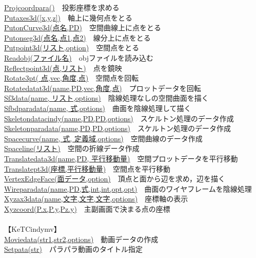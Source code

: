 \documentclass[papersize,a4paper,12pt,uplatex]{jsarticle}
\begin{document}
\begin{tabbing}
\hyperlink{projcoordpara}{Projcoordpara()}　\>投影座標を求める\\
\hyperlink{putaxes3d}{Putaxes3d([x,y,z])}　\>軸上に幾何点をとる\\
\hyperlink{putonCurve3d}{PutonCurve3d(点名,PD)}　\>空間曲線上に点をとる\\
\hyperlink{putonseg3d}{Putonseg3d(点名,点1,点2)}　\>線分上に点をとる\\
\hyperlink{putpoint3d}{Putpoint3d(リスト,option)}　\>空間点をとる\\
\hyperlink{readobj}{Readobj(ファイル名)}　\>objファイルを読み込む\\
\hyperlink{reflectpoint3d}{Reflectpoint3d(点,リスト)}　\>点を鏡映\\
\hyperlink{rotate3pt}{Rotate3pt( 点,vec,角度,点)}　\>空間点を回転\\
\hyperlink{rotatedata3d}{Rotatedatat3d(name,PD,vec,角度,点)}　\>プロットデータを回転\\
\hyperlink{sf3data}{Sf3data(name, リスト,options)}　\>陰線処理なしの空間曲面を描く\\
\hyperlink{sfbdparadata}{Sfbdparadata(name, 式,options)}　\>曲面を陰線処理して描く\\
\hyperlink{skeletondatacindy}{Skeletondatacindy(name,PD,PD,options)}　\>スケルトン処理のデータ作成\\
\hyperlink{skeletonparadata}{Skeletonparadata(name,PD,PD,options)}　\>スケルトン処理のデータ作成\\
\hyperlink{spacecurve}{Spacecurve(name, 式, 定義域,options)}　\>空間曲線のデータ作成\\
\hyperlink{spaceline}{Spaceline(リスト)}　\>空間の折線データ作成\\
\hyperlink{translatedata3d}{Translatedata3d(name,PD, 平行移動量)}　\>空間プロットデータを平行移動\\
\hyperlink{translatept3d}{Translatept3d(座標,平行移動量)}　\>空間点を平行移動\\
\hyperlink{vertexedgeface}{VertexEdgeFace(面データ,option)}　\>頂点と面から辺を求め，辺を描く\\
\hyperlink{wireparadata}{Wireparadata(name,PD,式,int,int,opt,opt)}　\>曲面のワイヤフレームを陰線処理\\
\hyperlink{xyzax3data}{Xyzax3data(name,文字,文字,文字,options)}　\>座標軸の表示\\
\hyperlink{xyzcoord}{Xyzcoord(P.x,P.y,Pz.y)}　\>主副画面で決まる点の座標\\
　\\
【KeTCindymv】\\
\hyperlink{moviedata}{Moviedata(str1,str2,options)}　\>動画データの作成\\
\hyperlink{setpara}{Setpata(str)}　\>パラパラ動画のタイトル指定\\
\end{tabbing}


\end{document}
